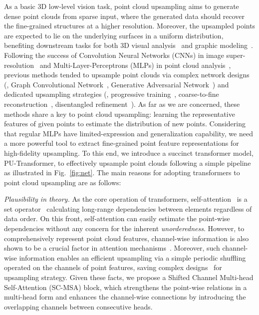 As a basic 3D low-level vision task, point cloud upsampling aims to generate dense point clouds from sparse input, where the generated data should recover the fine-grained structures at a higher resolution. Moreover, the upsampled points are expected to lie on the underlying surfaces in a uniform distribution, benefiting downstream tasks for both 3D visual analysis~\cite{liu2019relation,qiu2021pnp} and graphic modeling~\cite{mitra2003estimating,mitra2004registration}. Following the success of Convolution Neural Networks (CNNs) in image super-resolution~\cite{dong2015image,kim2016accurate,anwar2020deep} and Multi-Layer-Perceptrons (MLPs) in point cloud analysis~\cite{qi2017pointnet,qi2017pointnet++}, previous methods tended to upsample point clouds via complex network designs (\eg, Graph Convolutional Network~\cite{qian2021pu}, Generative Adversarial Network~\cite{li2019pu}) and dedicated upsampling strategies (\eg, progressive training~\cite{yifan2019patch}, coarse-to-fine reconstruction~\cite{liu2020spu}, disentangled refinement~\cite{li2021point}). As far as we are concerned, these methods share a key to point cloud upsampling: learning the representative features of given points to estimate the distribution of new points. Considering that regular MLPs have limited-expression and generalization capability, we need a more powerful tool to extract fine-grained point feature representations for high-fidelity upsampling. To this end, we introduce a succinct transformer model, PU-Transformer, to effectively upsample point clouds following a simple pipeline as illustrated in Fig.~\ref{fig:net}. The main reasons for adopting transformers to point cloud upsampling are as follows:

\emph{Plausibility in theory.} As the core operation of transformers, self-attention~\cite{vaswani2017attention} is a set operator~\cite{zhao2021point} calculating long-range dependencies between elements regardless of data order. On this front, self-attention can easily estimate the point-wise dependencies without any concern for the inherent \emph{unorderedness}. However, to comprehensively represent point cloud features, channel-wise information is also shown to be a crucial factor in attention mechanisms~\cite{qiu2021geometric,qiu2021investigating}. Moreover, such channel-wise information enables an efficient upsampling via a simple periodic shuffling~\cite{shi2016real} operated on the channels of point features, saving complex designs~\cite{liu2020spu,li2019pu,li2021point,yifan2019patch} for upsampling strategy. Given these facts, we propose a Shifted Channel Multi-head Self-Attention (SC-MSA) block, which strengthens the point-wise relations in a multi-head form and enhances the channel-wise connections by introducing the overlapping channels between consecutive heads.

